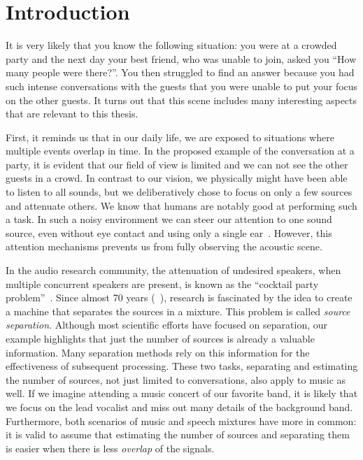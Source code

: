 \chapter{Introduction}\label{ch:introduction}

It is very likely that you know the following situation: you were at a crowded party and the next day your best friend, who was unable to join, asked you ``How many people were there?''.
You then struggled to find an answer because you had such intense conversations with the guests that you were unable to put your focus on the other guests.
It turns out that this scene includes many interesting aspects that are relevant to this thesis.
\par
First, it reminds us that in our daily life, we are exposed to situations where multiple events overlap in time.
In the proposed example of the conversation at a party, it is evident that our field of view is limited and we can not see the other guests in a crowd.
In contrast to our vision, we physically might have been able to listen to all sounds, but we deliberatively chose to focus on only a few sources and attenuate others.
We know that humans are notably good at performing such a task.
In such a noisy environment we can steer our attention to one sound source, even without eye contact and using only a single ear~\cite{bregman90}.
However, this attention mechanisms prevents us from fully observing the acoustic scene.
\par
In the audio research community, the attenuation of undesired speakers, when multiple concurrent speakers are present, is known as the ``cocktail party problem''~\cite{haykin05}.
Since almost 70 years (~\cite{cherry53}), research is fascinated by the idea to create a machine that separates the sources in a mixture.
This problem is called \emph{source separation}.
Although most scientific efforts have focused on separation, our example highlights that just the number of sources is already a valuable information.
Many separation methods rely on this information for the effectiveness of subsequent processing.
These two tasks, separating and estimating the number of sources, not just limited to conversations, also apply to music as well.
If we imagine attending a music concert of our favorite band, it is likely that we focus on the lead vocalist and miss out many details of the background band.
Furthermore, both scenarios of music and speech mixtures have more in common: it is valid to assume that estimating the number of sources and separating them is easier when there is less \emph{overlap} of the signals.
